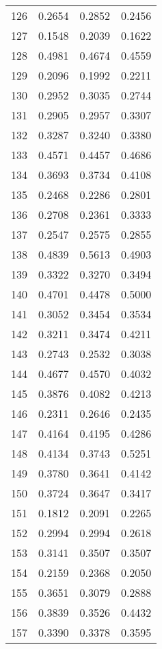 \begin{table}[ht]
\begin{tabular}{|c|c|c|c|}
126  &  0.2654   &  0.2852   &  0.2456 \\ 
127  &  0.1548   &  0.2039   &  0.1622 \\ 
128  &  0.4981   &  0.4674   &  0.4559 \\ 
129  &  0.2096   &  0.1992   &  0.2211 \\ 
130  &  0.2952   &  0.3035   &  0.2744 \\ 
131  &  0.2905   &  0.2957   &  0.3307 \\ 
132  &  0.3287   &  0.3240   &  0.3380 \\ 
133  &  0.4571   &  0.4457   &  0.4686 \\ 
134  &  0.3693   &  0.3734   &  0.4108 \\ 
135  &  0.2468   &  0.2286   &  0.2801 \\ 
136  &  0.2708   &  0.2361   &  0.3333 \\ 
137  &  0.2547   &  0.2575   &  0.2855 \\ 
138  &  0.4839   &  0.5613   &  0.4903 \\ 
139  &  0.3322   &  0.3270   &  0.3494 \\ 
140  &  0.4701   &  0.4478   &  0.5000 \\ 
141  &  0.3052   &  0.3454   &  0.3534 \\ 
142  &  0.3211   &  0.3474   &  0.4211 \\ 
143  &  0.2743   &  0.2532   &  0.3038 \\ 
144  &  0.4677   &  0.4570   &  0.4032 \\ 
145  &  0.3876   &  0.4082   &  0.4213 \\ 
146  &  0.2311   &  0.2646   &  0.2435 \\ 
147  &  0.4164   &  0.4195   &  0.4286 \\ 
148  &  0.4134   &  0.3743   &  0.5251 \\ 
149  &  0.3780   &  0.3641   &  0.4142 \\ 
150  &  0.3724   &  0.3647   &  0.3417 \\ 
151  &  0.1812   &  0.2091   &  0.2265 \\ 
152  &  0.2994   &  0.2994   &  0.2618 \\ 
153  &  0.3141   &  0.3507   &  0.3507 \\ 
154  &  0.2159   &  0.2368   &  0.2050 \\ 
155  &  0.3651   &  0.3079   &  0.2888 \\ 
156  &  0.3839   &  0.3526   &  0.4432 \\ 
157  &  0.3390   &  0.3378   &  0.3595 \\ 

\end{tabular}
\end{table}
